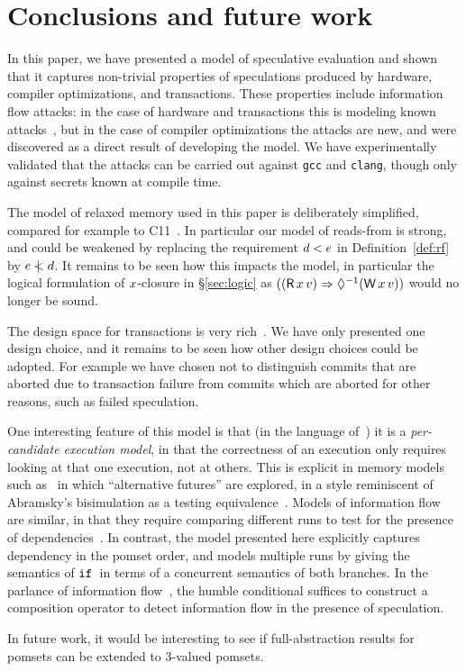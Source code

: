 \section{Conclusions and future work}

In this paper, we have presented a model of speculative evaluation and
shown that it captures non-trivial properties of speculations produced
by hardware, compiler optimizations, and transactions. These properties
include information flow attacks: in the case of hardware and transactions
this is modeling known attacks~\cite{DBLP:journals/corr/abs-1801-01203,DBLP:conf/uss/DisselkoenKPT17},
but in the case of compiler optimizations the attacks are new, and were
discovered as a direct result of developing the model. We have experimentally
validated that the attacks can be carried out against \verb|gcc| and \verb|clang|,
though only against secrets known at compile time.

The model of relaxed memory used in this paper is deliberately
simplified, compared for example to
C11~\cite{Boehm:2008:FCC:1375581.1375591,Batty:2011:MCC:1926385.1926394}.
In particular our model of reads-from is strong, and could be weakened
by replacing the requirement $d<e$ in Definition~\ref{def:rf}
by $e\mathrel{\,\mid\!\!\!<}d$. It remains to be seen how this impacts the model,
in particular the logical formulation of $x$-closure in
\S\ref{sec:logic} as
$((\DR{\aLoc}{\aVal}) \Rightarrow \once(\DW{\aLoc}{\aVal}))$
would no longer be sound.

The design space for transactions is very rich~\cite{DBLP:journals/pacmpl/DongolJR18}.
We have only presented one design choice, and it remains to be seen how other
design choices could be adopted. For example we have chosen not to distinguish
commits that are aborted due to transaction failure from commits which are aborted
for other reasons, such as failed speculation.

One interesting feature of this model is that (in the language
of~\cite{Pichon-Pharabod:2016:CSR:2837614.2837616}) it is a
\emph{per-candidate execution model}, in that the correctness of an
execution only requires looking at that one execution, not at
others. This is explicit in memory models such
as~\cite{Jagadeesan:2010:GOS:2175486.2175503,Kang:2017:PSR:3009837.3009850} in which
``alternative futures'' are explored, in a style reminiscent of
Abramsky's bisimulation as a testing equivalence~\cite{ABRAMSKY1987225}. Models of
information flow are similar, in that they require comparing different
runs to test for the presence of dependencies~\cite{Clarkson:2010:HYP:1891823.1891830}. In contrast, the model
presented here explicitly captures dependency in the pomset order, and
models multiple runs by giving the semantics of $\texttt{if}\,$ in terms of a
concurrent semantics of both branches.
In the parlance of information flow~\cite{Barthe:2004:SIF:1009380.1009669},
the humble conditional suffices to construct a composition operator to detect information flow  in the presence of speculation.

In future work, it would be interesting to see if full-abstraction
results for pomsets \cite{Plotkin:1997:TSP:266557.266600} can be extended to
3-valued pomsets.

